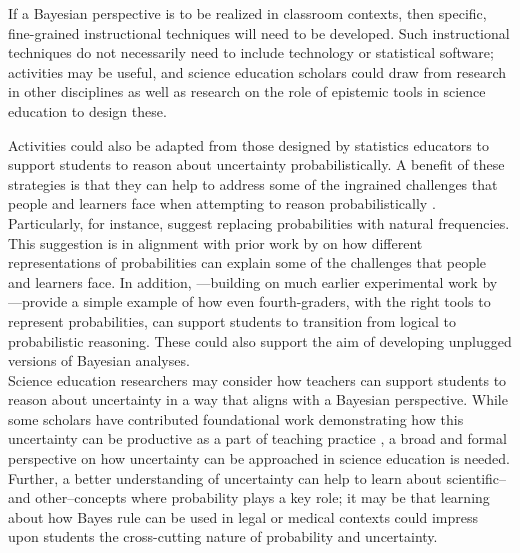 \documentclass[man]{apa7}
\begin{document}
If a Bayesian perspective is to be realized in classroom contexts, then specific, fine-grained instructional techniques will need to be developed. Such instructional techniques do not necessarily need to include technology or statistical software;  activities may be useful, and science education scholars could draw from research in other disciplines \parencite[e.g., ][]{caeli2020unplugged} as well as research on the role of epistemic tools in science education \parencite[e.g., ][]{stroupe2019introduction} to design these.

Activities could also be adapted from those designed by statistics educators to support students to reason about uncertainty probabilistically. A benefit of these strategies is that they can help to address some of the ingrained challenges that people and learners face when attempting to reason probabilistically \parencite[e.g., ][]{tk74}. Particularly, \textcite{bkbm18} for instance, suggest replacing probabilities with natural frequencies. This suggestion is in alignment with prior work by \textcite{gh95} on how different representations of probabilities can explain some of the challenges that people and learners face. In addition, \textcite{me14}—building on much earlier experimental work by \textcite{wason1971natural}—provide a simple example of how even fourth-graders, with the right tools to represent probabilities, can support students to transition from logical to probabilistic reasoning. These could also support the aim of developing unplugged versions of Bayesian analyses. \\

Science education researchers may consider how teachers can support students to reason about uncertainty in a way that aligns with a Bayesian perspective. While some scholars have contributed foundational work demonstrating how this uncertainty can be productive as a part of teaching practice \parencite{manz2018supporting}, a broad and formal perspective on how uncertainty can be approached in science education is needed. Further, a better understanding of uncertainty can help to learn about scientific--and other--concepts where probability plays a key role; it may be that learning about how Bayes rule can be used in legal or medical contexts could impress upon students the cross-cutting nature of probability and uncertainty.  \\
\end{document}
